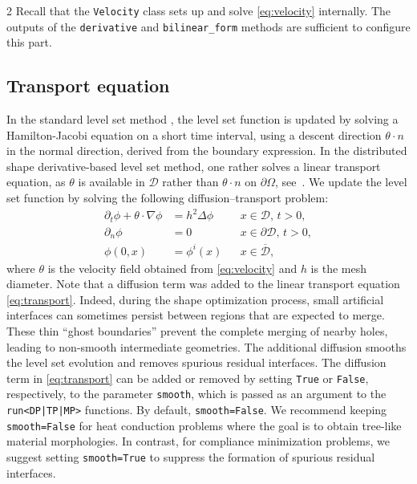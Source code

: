 \documentclass[a4paper, oneside]{article}
\newcommand{\hold}{\mathcal{D}}
\newcommand{\Om}{\Omega}
\newcommand{\code}[1]{\texttt{#1}}
\begin{document}
\begin{multicols}{2}
Recall that the \code{Velocity} class sets up and solve \eqref{eq:velocity} internally.
The outputs of the \code{derivative} and \code{bilinear\_form} methods
are sufficient to configure this part. 

\subsection{Transport equation}
\label{sub:level}

In the standard level set method \cite{MR965860}, the level set function is updated by solving
a Hamilton-Jacobi equation on a short time interval, using a descent direction $\theta\cdot n$
in the normal direction,  derived from the boundary expression.
In the distributed shape derivative-based level set method,
one rather solves a linear transport equation, as $\theta$ is available
in $\hold$ rather than $\theta\cdot n$ on $\partial\Om$, see~\cite{MR3535238}.  
We update the level set function by solving the following diffusion--transport problem:
\begin{equation} \label{eq:transport}
	\begin{aligned}
	\partial_t \phi+\theta\cdot\nabla\phi &= h^2\Delta\phi && x\in \mathcal{D},\, t>0, \\
						\partial_{n} \phi &= 0 && x\in \partial\mathcal{D},\, t>0, \\
							   \phi(0, x) &= \phi^{i}(x) && x\in \overline{\mathcal{D}},
	\end{aligned}
	\end{equation}
where $\theta$ is the velocity field obtained from \eqref{eq:velocity}
and $h$ is the mesh diameter.
Note that a diffusion term was added to
the linear transport equation \eqref{eq:transport}.
Indeed, during the shape optimization process, small artificial interfaces
can sometimes persist between regions that are expected to merge.
These thin ``ghost boundaries'' prevent the complete merging of nearby holes,
leading to non-smooth intermediate geometries.
The additional diffusion smooths the level set evolution
and removes spurious residual interfaces.
The diffusion term in \eqref{eq:transport} can be added or removed
by setting \code{True} or \code{False}, respectively, to the parameter \code{smooth},
which is passed as an argument to the \code{run<DP|TP|MP>} functions.
By default, \code{smooth=False}.
We recommend keeping \code{smooth=False} for heat conduction problems
where the goal is to obtain tree-like material morphologies.
In contrast, for compliance minimization problems,
we suggest setting \code{smooth=True} to suppress
the formation of spurious residual interfaces.


\end{multicols}
\end{document}
